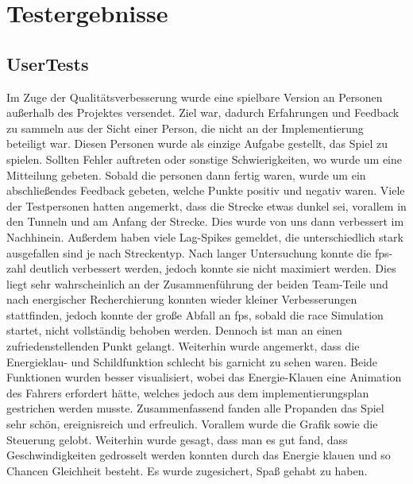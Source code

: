 \documentclass[parskip=full]{scrartcl}
\begin{document}
	
	
	
	
	\pagebreak
	
	\pagebreak

	\section{Testergebnisse}
	
	
	
	
	
	\pagebreak

	\subsection{UserTests}
	Im Zuge der Qualitätsverbesserung wurde eine spielbare Version an Personen 
	außerhalb des Projektes versendet. Ziel war, dadurch Erfahrungen und 
	Feedback zu sammeln aus der Sicht einer Person, die nicht an der 
	Implementierung beteiligt war.
	Diesen Personen wurde als einzige Aufgabe gestellt, das Spiel zu spielen.
	Sollten Fehler auftreten oder sonstige Schwierigkeiten, wo wurde 
	um eine Mitteilung gebeten. Sobald die personen dann fertig waren, wurde 
	um ein abschließendes Feedback gebeten, welche Punkte positiv und negativ 
	waren.
	Viele der Testpersonen hatten angemerkt, dass die Strecke etwas dunkel sei, 
	vorallem in den Tunneln und am Anfang der Strecke. Dies wurde von uns dann 
	verbessert im Nachhinein.
	Außerdem haben viele Lag-Spikes gemeldet, die unterschiedlich stark 
	ausgefallen sind je nach Streckentyp.
	Nach langer Untersuchung konnte die fps-zahl deutlich verbessert werden, 
	jedoch konnte sie nicht maximiert werden. Dies liegt sehr wahrscheinlich 
	an der Zusammenführung der beiden Team-Teile und nach energischer 
	Recherchierung konnten wieder kleiner Verbesserungen stattfinden, jedoch 
	konnte der große Abfall an fps, sobald die race Simulation startet, nicht 
	vollständig behoben werden. Dennoch ist man an einen zufriedenstellenden 
	Punkt gelangt. 
	Weiterhin wurde angemerkt, dass die Energieklau- und Schildfunktion 
	schlecht bis garnicht zu sehen waren. Beide Funktionen wurden 
	besser visualisiert, wobei das Energie-Klauen eine Animation des Fahrers 
	erfordert hätte, welches jedoch aus dem implementierungsplan gestrichen
	werden musste.
	Zusammenfassend fanden alle Propanden das Spiel sehr schön, ereignisreich 
	und erfreulich. Vorallem wurde die Grafik sowie die Steuerung gelobt.
	Weiterhin wurde gesagt, dass man es gut fand, dass Geschwindigkeiten 
	gedrosselt werden konnten durch das Energie klauen und so Chancen Gleichheit
	besteht.
	Es wurde zugesichert, Spaß gehabt zu haben.
	\pagebreak
\end{document}
